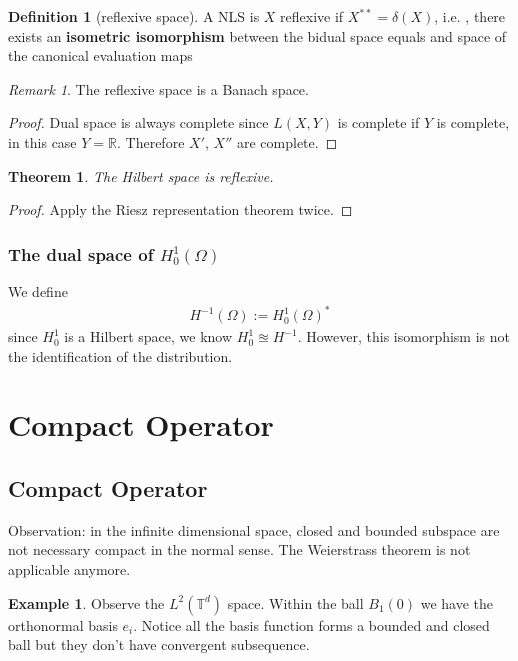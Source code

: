 \documentclass[a4paper,11pt,fleqn]{book}
\newtheorem{theorem}{Theorem}[section]
\theoremstyle{definition}
\newtheorem{definition}{Definition}[section]
\newtheorem*{example}{Example}
\theoremstyle{remark}
\newtheorem*{remark}{Remark}
\begin{document}
\begin{definition}[reflexive space]
	A NLS is $X$ reflexive if $X^{**} = \delta(X)$, i.e. , there exists an \textbf{isometric isomorphism} between the bidual space equals and space of the canonical evaluation maps
\end{definition}

\begin{remark}
The reflexive space is a Banach space.
\begin{proof}
	Dual space is always complete since $L(X,Y)$ is complete if $Y$ is complete, in this case $Y = \mathbb{R}$. Therefore $X'$, $X''$ are complete.
\end{proof}	
\end{remark}

\begin{theorem}
	The Hilbert space is reflexive.
\end{theorem}
\begin{proof}
	Apply the Riesz representation theorem twice.
\end{proof}


\subsubsection{The dual space of $H^1_0(\Omega)$}
We define
\begin{align*}
	H^{-1}(\Omega) := H_0^1(\Omega)^* 
\end{align*}
since $H^1_0$ is a Hilbert space, we know $H_0^1 \approxeq H^{-1}$. However, this isomorphism is not the identification of the distribution. 


\newpage

\section{Compact Operator}
\subsection{Compact Operator}
Observation: in the infinite dimensional space, closed and bounded subspace are not necessary compact in the normal sense. The Weierstrass theorem is not applicable anymore. 

\begin{example}
Observe the $L^2(\mathbb{T}^d)$ space. Within the ball $B_1(0)$ we have the orthonormal basis $e_i$. Notice all the basis function forms a bounded and closed ball but they don't have convergent subsequence. 
\end{example}
\end{document}
